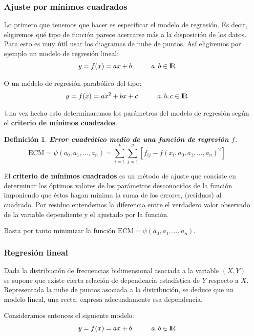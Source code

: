 \documentclass[10pt, a4paper]{article}
\theoremstyle{theorem-style}
\theoremstyle{definition-style}
\newtheorem{ndef}{Definición}[section]
\theoremstyle{remark-style}
\theoremstyle{example-style}
\theoremstyle{definition-style}
\theoremstyle{remark-style}
\begin{document}
	\subsubsection{Ajuste por mínimos cuadrados}

	Lo primero que tenemos que hacer es especificar el modelo de regresión. Es
	decir, eligiremos qué tipo de función parece acercarse más a la disposición de
	los datos. Para esto es muy útil usar los diagramas de nube de puntos. Así
	eligiremos por ejemplo un modelo de regresión lineal: $$ y = f(x) = ax + b \hspace{1cm} a,b \in \rm I\!R $$

	O un módelo de regresión parabólico del tipo: $$ y = f(x) = ax^2 +bx + c \hspace{1cm} a,b,c \in \rm I\!R $$

	Una vez hecho esto determinaremos los parámetros del modelo de regresión según
	el \textbf{criterio de mínimos cuadrados}. \vspace{4mm}

\begin{ndef}
	\textbf{Error cuadrático medio de una función de regresión $f$.}
	$$ \text{ECM} = \psi(a_0,a_1,\ldots,a_n) =
	 		\sum_{i=1}^k \sum_{j=1}^p [f_{ij} - f{(x_i,a_0,a_1,\ldots,a_n)}^2] $$
\end{ndef}

El \textbf{criterio de mínimos cuadrados} es un método de ajuste que consiste en determinar los óptimos valores de los parámetros
	desconocidos de la función imponiendo que éstos hagan mínima la suma de los
	errores, (residuos) al cuadrado. Por residuo entendemos la diferencia entre
	el verdadero valor observado de la variable dependiente y el ajustado por la
	función.
	
Basta por tanto minimizar la función $ \text{ECM} = \psi(a_0,a_1,\ldots,a_n)$.

\pagebreak

\subsubsection{Regresión lineal}

Dada la distribución de frecuencias bidimensional asociada a la variable $(X,Y)$
	se supone que existe cierta relación de dependencia estadística de $Y$ respecto
	a $X$. Representada la nube de puntos asociada a la distribución, se deduce que
	un modelo lineal, una recta, expresa adecuadamente esa dependencia.
	
	Consideramos entonces el siguiente modelo: $$ y = f(x) = ax + b\hspace{1cm} a,b \in \rm I\!R $$
	
\end{document}

